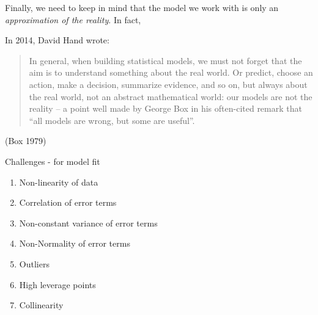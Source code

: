 \documentclass[10pt,ignorenonframetext,]{beamer}
\providecommand{\tightlist}{%
  \setlength{\itemsep}{0pt}\setlength{\parskip}{0pt}}
\begin{document}
\begin{frame}

Finally, we need to keep in mind that the model we work with is only an
\emph{approximation of the reality}. In fact,

\vspace{4mm}

In 2014, David Hand wrote:

\vspace{4mm}

\begin{quote}
In general, when building statistical models, we must
not forget that the aim is to understand something about
the real world. Or predict, choose an action, make
a decision, summarize evidence, and so on, but always
about the real world, not an abstract mathematical
world: our models are not the reality -- a point well
made by George Box in his often-cited remark that
``all models are wrong, but some are useful''.
\end{quote}

(Box 1979)

\end{frame}

\begin{frame}

\begin{block}{Challenges - for model fit}

\begin{enumerate}
\def\labelenumi{\arabic{enumi}.}
\tightlist
\item
  Non-linearity of data
\item
  Correlation of error terms
\item
  Non-constant variance of error terms
\item
  Non-Normality of error terms
\item
  Outliers
\item
  High leverage points
\item
  Collinearity
\end{enumerate}

\end{block}

\end{frame}
\end{document}
